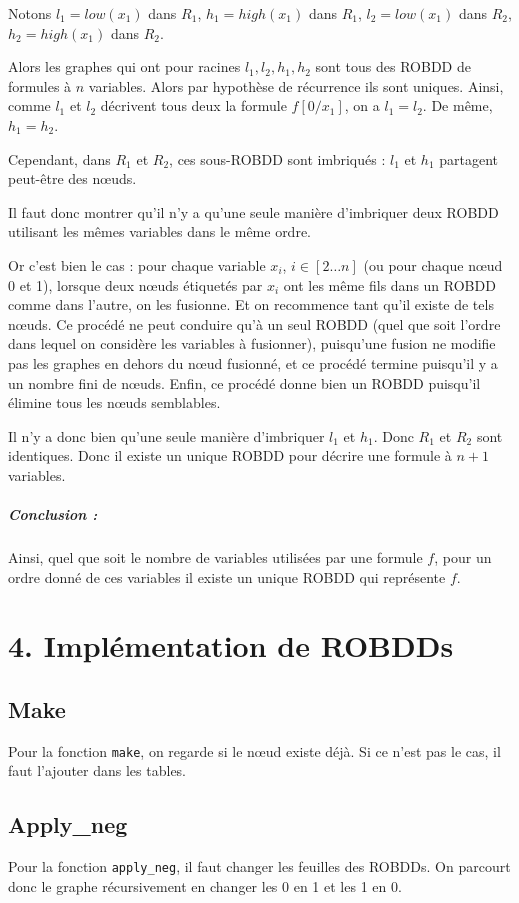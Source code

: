 \documentclass[12pt]{article}
\def\code#1{\texttt{#1}}
\begin{document}
Notons $l_1 = low(x_1)$ dans $R_1$,  $h_1 = high(x_1)$ dans $R_1$, $l_2 = low(x_1)$ dans $R_2$,  $h_2 = high(x_1)$ dans $R_2$.

Alors les graphes qui ont pour racines $l_1, l_2, h_1, h_2$ sont tous des ROBDD de formules à $n$ variables. Alors par hypothèse de récurrence ils sont uniques. Ainsi, comme $l_1$ et $l_2$ décrivent tous deux la formule $f[0/x_1]$, on a $l_1=l_2$. De même, $h_1=h_2$.

Cependant, dans $R_1$ et $R_2$, ces sous-ROBDD sont imbriqués : $l_1$ et $h_1$ partagent peut-être des n\oe uds.

Il faut donc montrer qu'il n'y a qu'une seule manière d'imbriquer deux ROBDD utilisant les mêmes variables dans le même ordre.

Or c'est bien le cas : pour chaque variable $x_i$, $i\in[2\dots n]$ (ou pour chaque n\oe ud 0 et 1), lorsque deux n\oe uds étiquetés par $x_i$ ont les même fils dans un ROBDD comme dans l'autre, on les fusionne. Et on recommence tant qu'il existe de tels n\oe uds. Ce procédé ne peut conduire qu'à un seul ROBDD (quel que soit l'ordre dans lequel on considère les variables à fusionner), puisqu'une fusion ne modifie pas les graphes en dehors du n\oe ud fusionné, et ce procédé termine puisqu'il y a un nombre fini de n\oe uds. Enfin, ce procédé donne bien un ROBDD puisqu'il élimine tous les n\oe uds semblables.

Il n'y a donc bien qu'une seule manière d'imbriquer $l_1$ et $h_1$. Donc $R_1$ et $R_2$ sont identiques. Donc il existe un unique ROBDD pour décrire une formule à $n+1$ variables.

\subparagraph{Conclusion :} Ainsi, quel que soit le nombre de variables utilisées par une formule $f$, pour un ordre donné de ces variables il existe un unique ROBDD qui représente $f$.


\section*{4. Implémentation de ROBDDs}
\subsection*{Make}
Pour la fonction \code{make}, on regarde si le n\oe ud existe déjà. Si ce n'est pas le cas, il faut l'ajouter dans les tables.

\subsection*{Apply\_neg}
Pour la fonction \code{apply\_neg}, il faut changer les feuilles des ROBDDs. On parcourt donc le graphe récursivement en changer les 0 en 1 et les 1 en 0.
\end{document}
